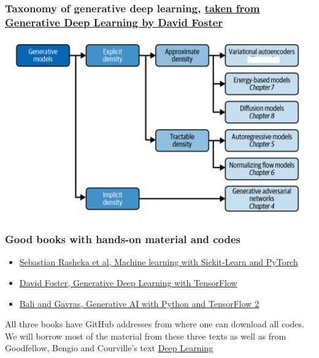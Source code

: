 \documentclass{beamer}
\begin{document}
\begin{frame}
\frametitle{Taxonomy of generative deep learning, \href{{https://www.oreilly.com/library/view/generative-deep-learning/9781098134174/ch01.html}}{taken from Generative Deep Learning by David Foster}}

\vspace{6mm}

\centerline{\includegraphics[width=1.0\linewidth]{figures/generativemodels.png}}

\vspace{6mm}
\end{frame}

\begin{frame}
\frametitle{Good books with hands-on material and codes}

\begin{block}{}
\begin{itemize}
\item \href{{https://sebastianraschka.com/blog/2022/ml-pytorch-book.html}}{Sebastian Rashcka et al, Machine learning with Sickit-Learn and PyTorch}

\item \href{{https://www.oreilly.com/library/view/generative-deep-learning/9781098134174/ch01.html}}{David Foster, Generative Deep Learning with TensorFlow}

\item \href{{https://github.com/PacktPublishing/Hands-On-Generative-AI-with-Python-and-TensorFlow-2}}{Bali and Gavras, Generative AI with Python and TensorFlow 2}
\end{itemize}

\noindent
\end{block}

All three books have GitHub addresses from where  one can download all codes. We will borrow most of the material from these three texts as well as 
from Goodfellow, Bengio and Courville's text \href{{https://www.deeplearningbook.org/}}{Deep Learning}
\end{frame}
\end{document}
